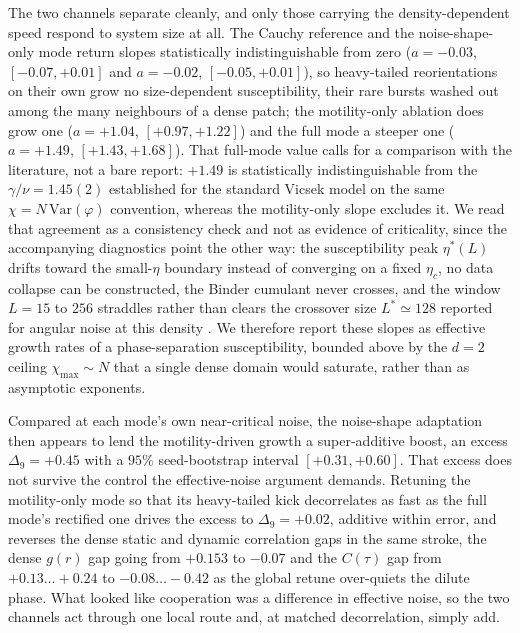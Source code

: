 \documentclass[11pt,a4paper]{article}
\begin{document}
The two channels separate cleanly, and only those carrying the
density-dependent speed respond to system size at all. The Cauchy
reference and the noise-shape-only mode return slopes
statistically indistinguishable from zero ($a = -0.03$,
$[-0.07, +0.01]$ and $a = -0.02$, $[-0.05, +0.01]$), so
heavy-tailed reorientations on their own grow no size-dependent
susceptibility, their rare bursts washed out among the many
neighbours of a dense patch; the motility-only ablation does grow
one ($a = +1.04$, $[+0.97, +1.22]$) and the full mode a steeper
one ($a = +1.49$, $[+1.43, +1.68]$). That full-mode value calls
for a comparison with the literature, not a bare report:
$+1.49$ is statistically indistinguishable from
the $\gamma/\nu = 1.45(2)$ established for the standard Vicsek
model \citep{Baglietto2008, Baglietto2012} on the same
$\chi = N\,\mathrm{Var}(\varphi)$ convention, whereas the
motility-only slope excludes it. We read that agreement as a
consistency check and not as evidence of criticality, since the
accompanying diagnostics point the other way: the susceptibility
peak $\eta^\ast(L)$ drifts toward the small-$\eta$ boundary
instead of converging on a fixed $\eta_c$, no data collapse can
be constructed, the Binder cumulant never crosses, and the window
$L = 15$ to $256$ straddles rather than clears the crossover size
$L^\ast \simeq 128$ reported for angular noise at this density
\citep{Chate2008}. We therefore report these slopes as effective
growth rates of a phase-separation susceptibility, bounded above
by the $d = 2$ ceiling $\chi_{\max} \sim N$ that a single dense
domain would saturate, rather than as asymptotic exponents.

Compared at each mode's own near-critical noise, the noise-shape
adaptation then appears to lend the motility-driven growth a
super-additive boost, an excess $\Delta_9 = +0.45$ with a $95\%$
seed-bootstrap interval $[+0.31, +0.60]$. That excess does not
survive the control the effective-noise argument demands.
Retuning the motility-only mode so that its heavy-tailed kick
decorrelates as fast as the full mode's rectified one drives the
excess to $\Delta_9 = +0.02$, additive within error, and reverses
the dense static and dynamic correlation gaps in the same stroke,
the dense $g(r)$ gap going from $+0.153$ to $-0.07$ and the
$C(\tau)$ gap from $+0.13 \ldots +0.24$ to
$-0.08 \ldots -0.42$ as the global retune over-quiets the dilute
phase. What looked like cooperation was a difference in effective
noise, so the two channels act through one local route and, at
matched decorrelation, simply add.
\end{document}
